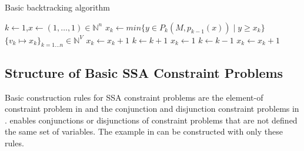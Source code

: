 \begin{algorithm}[p]
    \caption{Basic backtracking algorithm}
    \begin{algorithmic}[1]
        \vspace{-0.45em}
            \State $k\gets1$,\quad$x\gets(1,\dots,1)\in\mathbb N^n$\vspace{-0.45em}
            \vspace{-0.45em}
                \State $x_k\gets min\{y\in P_k(M,p_{k-1}(x))\mid y\geq x_k\}$\vspace{-0.45em}
                \vspace{-0.45em}
                    \vspace{-0.45em}
                         $\{v_k\mapsto x_k\}_{k=1\dots n}\in\mathbb N^V$\vspace{-0.45em}
                        \State $x_k\gets x_k+1$\vspace{-0.45em}
                    \Else\vspace{-0.45em}
                        \State $k\gets k+1$\vspace{-0.45em}
                        \State $x_k\gets1$\vspace{-0.45em}
                    \EndIf
                \Else\vspace{-0.45em}
                    \State $k\gets k-1$\vspace{-0.45em}
                    \vspace{-0.45em}
                        \State$x_k\gets x_k+1$\vspace{-0.45em}
                    \Else\vspace{-0.45em}
                    \EndIf
                \EndIf
            \EndWhile
        \EndProcedure
    \end{algorithmic}
    \label{backtrackalg}
\end{algorithm}

\subsection{Structure of Basic SSA Constraint Problems}

    Basic construction rules for SSA constraint problems are the
    element-of constraint problem in 
    and the conjunction and disjunction constraint problems in
    .
     enables conjunctions or disjunctions of constraint
    problems that are not defined the same set of variables.
    The example in  can be constructed with only
    these rules.

